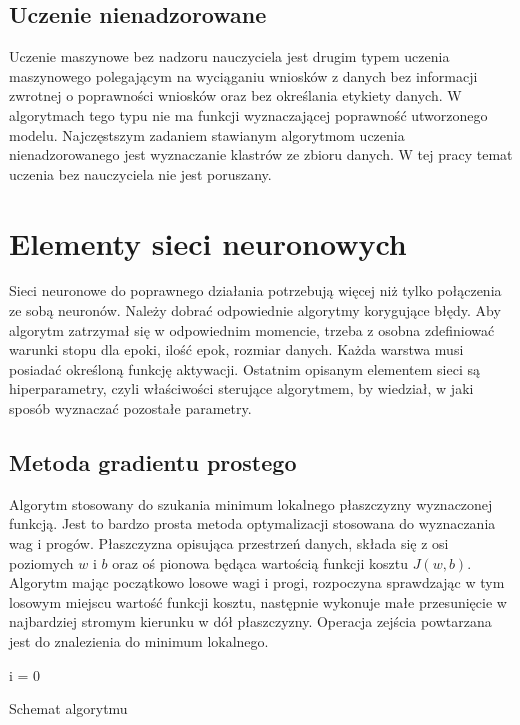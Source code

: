 \documentclass[12pt,a4paper,twoside,titlepage,openright]{book}
\newenvironment{algorytm}[1][htb]
  {\renewcommand{\algorithmcfname}{Algorytm}%
   \begin{algorithm}[#1]%
  }{\end{algorithm}}
\begin{document}
\subsection*{Uczenie nienadzorowane}
Uczenie maszynowe bez nadzoru nauczyciela jest drugim typem uczenia maszynowego polegającym na wyciąganiu wniosków z danych bez informacji zwrotnej o poprawności wniosków oraz bez określania etykiety danych. W algorytmach tego typu nie ma funkcji wyznaczającej poprawność utworzonego modelu. Najczęstszym zadaniem stawianym algorytmom uczenia nienadzorowanego jest wyznaczanie klastrów ze zbioru danych. W tej pracy temat uczenia bez nauczyciela nie jest poruszany.

\section{Elementy sieci neuronowych} 
Sieci neuronowe do poprawnego działania potrzebują więcej niż tylko połączenia ze sobą neuronów. Należy dobrać odpowiednie algorytmy korygujące błędy. Aby algorytm zatrzymał się w odpowiednim momencie, trzeba z osobna zdefiniować warunki stopu dla epoki, ilość epok, rozmiar danych. Każda warstwa musi posiadać określoną funkcję aktywacji. Ostatnim opisanym elementem sieci są hiperparametry, czyli właściwości sterujące algorytmem, by wiedział, w jaki sposób wyznaczać pozostałe parametry.

\subsection{Metoda gradientu prostego}
Algorytm stosowany do szukania minimum lokalnego płaszczyzny wyznaczonej funkcją. Jest to bardzo prosta metoda optymalizacji stosowana do wyznaczania wag i progów. Płaszczyzna opisująca przestrzeń danych, składa się z osi poziomych \(w\) i \(b\) oraz oś pionowa będąca wartością funkcji kosztu \(J(w,b)\). Algorytm mając początkowo losowe wagi i progi, rozpoczyna sprawdzając w tym losowym miejscu wartość funkcji kosztu, następnie wykonuje małe przesunięcie w najbardziej stromym kierunku w dół płaszczyzny. Operacja zejścia powtarzana jest do znalezienia do minimum lokalnego.

\begin{algorytm}
i = 0\;
\caption{Schemat algorytmu}
\end{algorytm}
\end{document}
